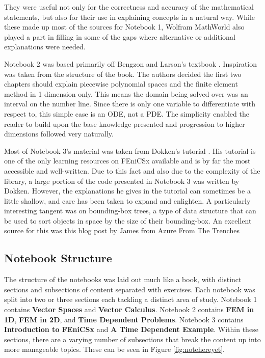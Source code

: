 They were useful not only for the correctness and accuracy of the mathematical statements, but also for their use in explaining concepts in a natural way. While these made up most of the sources for Notebook 1, Wolfram MathWorld \cite{wolfram-mathworld} also played a part in filling in some of the gaps where alternative or additional explanations were needed.

Notebook 2 was based primarily off Bengzon and Larson's textbook \cite{bengzon-larson-fem}. Inspiration was taken from the structure of the book. The authors decided the first two chapters should explain piecewise polynomial spaces and the finite element method in 1 dimension only. This means the domain being solved over was an interval on the number line. Since there is only one variable to differentiate with respect to, this simple case is an ODE, not a PDE. The simplicity enabled the reader to build upon the base knowledge presented and progression to higher dimensions followed very naturally.

Most of Notebook 3's material was taken from Dokken's tutorial \cite{fenics-tutorial}. His tutorial is one of the only learning resources on FEniCSx available and is by far the most accessible and well-written. Due to this fact and also due to the complexity of the library, a large portion of the code presented in Notebook 3 was written by Dokken. However, the explanations he gives in the tutorial can sometimes be a little shallow, and care has been taken to expand and enlighten. A particularly interesting tangent was on bounding-box trees, a type of data structure that can be used to sort objects in space by the size of their bounding-box. An excellent source for this was this blog post by James from Azure From The Trenches \cite{aabb-tree}

\subsection{Notebook Structure}

The structure of the notebooks was laid out much like a book, with distinct sections and subsections of content separated with exercises. Each notebook was split into two or three sections each tackling a distinct area of study. Notebook 1 contains \textbf{Vector Spaces} and \textbf{Vector Calculus}. Notebook 2 contains \textbf{FEM in 1D}, \textbf{FEM in 2D}, and \textbf{Time Dependent Problems}. Notebook 3 contains \textbf{Introduction to FEniCSx} and \textbf{A Time Dependent Example}. Within these sections, there are a varying number of subsections that break the content up into more manageable topics. These can be seen in Figure \ref{fig:notehereyet}.

